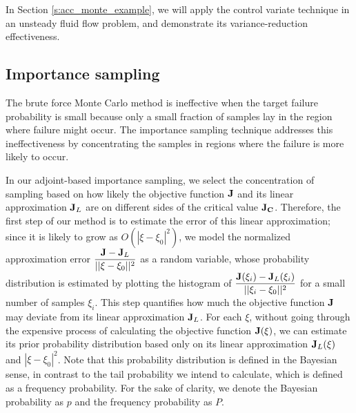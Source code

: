 In Section \ref{s:acc_monte_example},
we will apply the control variate technique
in an unsteady fluid flow problem, and demonstrate its variance-reduction
effectiveness.



\subsection{Importance sampling} \label{s:importance_sampling}

The brute force Monte Carlo method is ineffective when the target failure
probability
is small because only a small fraction of samples lay in the region where
failure might occur.  The importance sampling technique \cite[]{glynn_is}
addresses this
ineffectiveness by concentrating the samples in regions where the failure
is more likely to occur.

In our adjoint-based importance sampling, we select the concentration of
sampling based on how likely the objective function $\bf J$ and its linear
approximation ${\bf J}_L$ are on different sides of the critical value
${\bf J_C}$.  Therefore, the first step
of our method is to estimate the error of this linear approximation;
since it is likely to grow as $O(|\xi - \xi_0|^2)$, we model the
normalized approximation error
$\dfrac{{\bf J} - {\bf J}_L}{||\xi - \xi_0||^2}$ as
a random variable, whose probability distribution is estimated by plotting
the histogram of
$\dfrac{{\bf J}(\xi_i) - {\bf J}_L(\xi_i)}{||\xi_i - \xi_0||^2}$ 
for a small number of samples $\xi_i$.  This step quantifies how much the
objective function ${\bf J}$ may deviate from its linear approximation
${\bf J}_L$.  For each $\xi$, without going through the expensive process of
calculating the objective function ${\bf J}(\xi)$, we can estimate its prior
probability distribution based only on its linear approximation
${\bf J}_L(\xi)$ and $|\xi - \xi_0|^2$.  Note that this probability
distribution is defined in the Bayesian sense, in contrast to the tail
probability we intend to calculate, which is defined as a frequency probability.
For the sake of clarity, we denote the Bayesian probability as $p$ and the
frequency probability as $P$.

